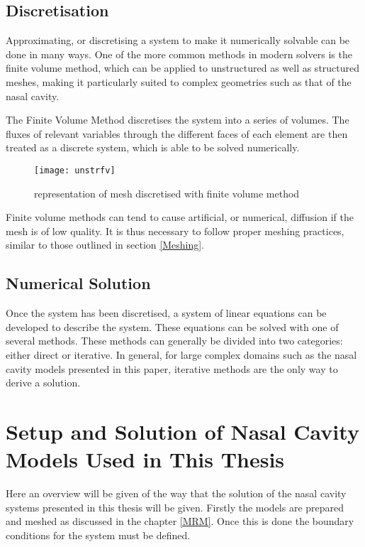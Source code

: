 \subsection{Discretisation}

Approximating, or discretising a system to make it numerically solvable can be done in many ways. One of the more common methods in modern solvers is the finite volume method, which can be applied to unstructured as well as structured meshes, making it particularly suited to complex geometries such as that of the nasal cavity.

The Finite Volume Method discretises the system into a series of volumes. The fluxes of relevant variables through the different faces of each element are then treated as a discrete system, which is able to be solved numerically.

\begin{figure}
  \texttt{[image: unstrfv]}
  \caption{representation of mesh discretised with finite volume method}
  \label{usfv}
\end{figure}

Finite volume methods can tend to cause artificial, or numerical, diffusion if the mesh is of low quality. It is thus necessary to follow proper meshing practices, similar to those outlined in section \ref{Meshing}.

\subsection{Numerical Solution}

Once the system has been discretised, a system of linear equations can be developed to describe the system. These equations can be solved with one of several methods. These methods can generally be divided into two categories: either direct or iterative. In general, for large complex domains such as the nasal cavity models presented in this paper, iterative methods are the only way to derive a solution.

\section{Setup and Solution of Nasal Cavity Models Used in This Thesis}
Here an overview will be given of the way that the solution of the nasal cavity systems presented in this thesis will be given. Firstly the models are prepared and meshed as discussed in the chapter \ref{MRM}. Once this is done the boundary conditions for the system must be defined. 

